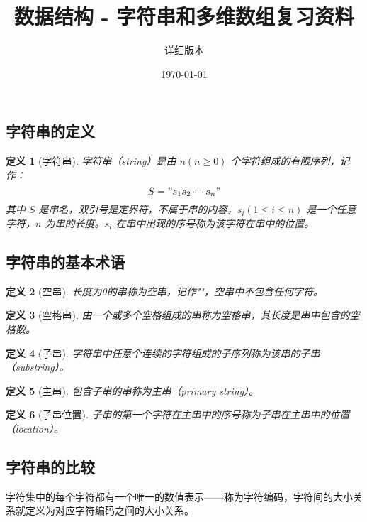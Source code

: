 \documentclass[12pt,a4paper]{amsart}
\title{\textbf{数据结构 - 字符串和多维数组复习资料}}
\author{详细版本}
\date{\today}
\newtheorem{definition}{定义}[section]
\begin{document}
\maketitle

\tableofcontents
\newpage

\subsection{字符串的定义}

\begin{definition}[字符串]
字符串（string）是由 $n(n \geq 0)$ 个字符组成的有限序列，记作：
$$S = "s_1s_2\cdots s_n"$$
其中 $S$ 是串名，双引号是定界符，不属于串的内容，$s_i(1 \leq i \leq n)$ 是一个任意字符，$n$ 为串的长度。$s_i$ 在串中出现的序号称为该字符在串中的位置。
\end{definition}

\subsection{字符串的基本术语}

\begin{definition}[空串]
长度为0的串称为空串，记作""，空串中不包含任何字符。
\end{definition}

\begin{definition}[空格串]
由一个或多个空格组成的串称为空格串，其长度是串中包含的空格数。
\end{definition}

\begin{definition}[子串]
字符串中任意个连续的字符组成的子序列称为该串的子串（substring）。
\end{definition}

\begin{definition}[主串]
包含子串的串称为主串（primary string）。
\end{definition}

\begin{definition}[子串位置]
子串的第一个字符在主串中的序号称为子串在主串中的位置（location）。
\end{definition}

\subsection{字符串的比较}

字符集中的每个字符都有一个唯一的数值表示——称为字符编码，字符间的大小关系就定义为对应字符编码之间的大小关系。
\end{document}
